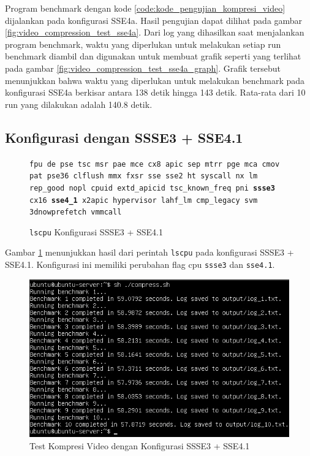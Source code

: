Program benchmark dengan kode \ref{code:kode_pengujian_kompresi_video} dijalankan pada konfigurasi SSE4a. Hasil pengujian dapat dilihat pada gambar \ref{fig:video_compression_test_sse4a}. Dari log yang dihasilkan saat menjalankan program benchmark, waktu yang diperlukan untuk melakukan setiap run benchmark diambil dan digunakan untuk membuat grafik seperti yang terlihat pada gambar \ref{fig:video_compression_test_sse4a_graph}. Grafik tersebut menunjukkan bahwa waktu yang diperlukan untuk melakukan benchmark pada konfigurasi SSE4a berkisar antara 138 detik hingga 143 detik. Rata-rata dari 10 run yang dilakukan adalah 140.8 detik.
\subsection{Konfigurasi dengan SSSE3 + SSE4.1}
\begin{figure}
    \texttt{fpu de pse tsc msr pae mce cx8 apic sep mtrr pge mca cmov pat pse36 clflush mmx fxsr sse sse2 ht syscall nx lm rep\_good nopl cpuid extd\_apicid tsc\_known\_freq pni \textbf{ssse3} cx16 \textbf{sse4\_1} x2apic hypervisor lahf\_lm cmp\_legacy svm 3dnowprefetch vmmcall}
    \caption{\texttt{lscpu} Konfigurasi SSSE3 + SSE4.1}
    \label{fig:lscpu_video_compression_test_ssse3,sse4.1}
\end{figure}

Gambar \ref{fig:lscpu_video_compression_test_ssse3,sse4.1} menunjukkan hasil dari perintah \texttt{lscpu} pada konfigurasi SSSE3 + SSE4.1. Konfigurasi ini memiliki perubahan flag cpu \texttt{ssse3} dan \texttt{sse4.1}.

\begin{figure}
    \centering
    \includegraphics[width=1\textwidth]
    {assets/pics/video-compression-test/ssse3,sse4.1.jpeg}
    \caption{Test Kompresi Video dengan Konfigurasi SSSE3 + SSE4.1}
    \label{fig:video_compression_test_ssse3,sse4.1}
\end{figure}

